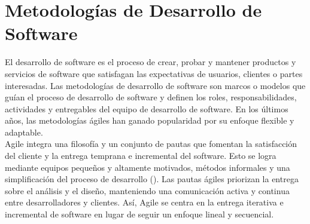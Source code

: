 \section{Metodologías de Desarrollo de Software}
El desarrollo de software es el proceso de crear, probar y mantener productos y servicios de software que satisfagan las expectativas de usuarios, clientes o partes interesadas. Las metodologías de desarrollo de software son marcos o modelos que guían el proceso de desarrollo de software y definen los roles, responsabilidades, actividades y entregables del equipo de desarrollo de software. En los últimos años, las metodologías ágiles han ganado popularidad por su enfoque flexible y adaptable.\\ 
Agile integra una filosofía y un conjunto de pautas que fomentan la satisfacción del cliente y la entrega temprana e incremental del software. Esto se logra mediante equipos pequeños y altamente motivados, métodos informales y una simplificación del proceso de desarrollo (\cite{pressman2005software}). Las pautas ágiles priorizan la entrega sobre el análisis y el diseño, manteniendo una comunicación activa y continua entre desarrolladores y clientes. Así, Agile se centra en la entrega iterativa e incremental de software en lugar de seguir un enfoque lineal y secuencial.

